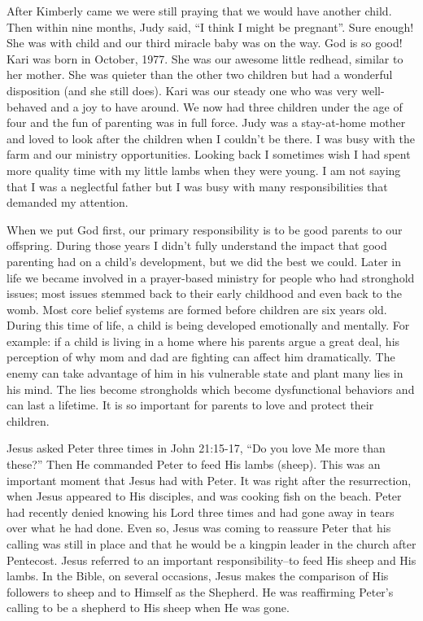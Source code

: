 \documentclass[oneside]{book}
\begin{document}
After Kimberly came we were still praying that we would have another child. Then within nine months, Judy said, “I think I might be pregnant”. Sure enough! She was with child and our third miracle baby was on the way. God is so good! Kari was born in October, 1977. She was our awesome little redhead, similar to her mother. She was quieter than the other two children but had a wonderful disposition (and she still does). Kari was our steady one who was very well-behaved and a joy to have around. We now had three children under the age of four and the fun of parenting was in full force. Judy was a stay-at-home mother and loved to look after the children when I couldn't be there. I was busy with the farm and our ministry opportunities. Looking back I sometimes wish I had spent more quality time with my little lambs when they were young. I am not saying that I was a neglectful father but I was busy with many responsibilities that demanded my attention.

When we put God first, our primary responsibility is to be good parents to our offspring. During those years I didn't fully understand the impact that good parenting had on a child's development, but we did the best we could. Later in life we became involved in a prayer-based ministry for people who had stronghold issues; most issues stemmed back to their early childhood and even back to the womb. Most core belief systems are formed before children are six years old. During this time of life, a child is being developed emotionally and mentally. For example: if a child is living in a home where his parents argue a great deal, his perception of why mom and dad are fighting can affect him dramatically. The enemy can take advantage of him in his vulnerable state and plant many lies in his mind. The lies become strongholds which become dysfunctional behaviors and can last a lifetime. It is so important for parents to love and protect their children.

Jesus asked Peter three times in John 21:15-17, “Do you love Me more than these?” Then He commanded Peter to feed His lambs (sheep). This was an important moment that Jesus had with Peter. It was right after the resurrection, when Jesus appeared to His disciples, and was cooking fish on the beach. Peter had recently denied knowing his Lord three times and had gone away in tears over what he had done. Even so, Jesus was coming to reassure Peter that his calling was still in place and that he would be a kingpin leader in the church after Pentecost. Jesus referred to an important responsibility--to feed His sheep and His lambs. In the Bible, on several occasions, Jesus makes the comparison of His followers to sheep and to Himself as the Shepherd. He was reaffirming Peter’s calling to be a shepherd to His sheep when He was gone.
\end{document}
